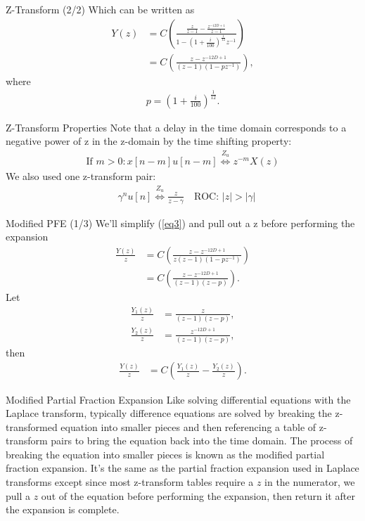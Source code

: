 \documentclass[
    orient=landscape,
    style=sailor
]{powerdot}
\begin{document}
\begin{slide}{Z-Transform (2/2)}	
	Which can be written as
	\begin{align}
	Y(z) &=  C\left(\frac{\frac{z}{z-1} - \frac{z^{-12D+1}}{z-1}}
	{1 - \left(1 + \frac{i}{100} \right)^{\frac{1}{12}}z^{-1}}\right) \\
	&=  C\left(\frac{z - z^{-12D+1}}{(z-1)(1 - p z^{-1})}\right), \label{eq3}
	\end{align}
	where 
	\begin{align}
	p = \left(1 + \frac{i}{100} \right)^{\frac{1}{12}}.
	\end{align}
\end{slide}

\begin{slide}{Z-Transform Properties}
	Note that a delay in the time domain corresponds to a negative power of z in the z-domain by the time shifting property:
	\begin{align}
	\text{If }m>0: x[n-m]u[n-m] \stackrel{Z_u}{\Longleftrightarrow} z^{-m} X(z) \label{prop1}
	\end{align}
	We also used one z-transform pair:
	\begin{align}
	&\gamma^nu[n] \stackrel{Z_u}{\Longleftrightarrow} \frac{z}{z-\gamma} \quad\text{ROC: } |z|>|\gamma| \label{tp1}
	\end{align}
\end{slide}

\begin{slide}{Modified PFE (1/3)}
	We'll simplify (\ref{eq3}) and pull out a z before performing the expansion
	\begin{align}
	\frac{Y(z)}{z} &= C \left( \frac{z - z^{-12D+1}}{z(z-1)(1 - pz^{-1})} \right) \\
	&= C \left( \frac{z - z^{-12D+1}}{(z-1)(z - p)} \right).
	\end{align}
	Let
	\begin{align}
	\frac{Y_1(z)}{z} &= \frac{z}{(z-1)(z - p)}, \\
	\frac{Y_2(z)}{z} &= \frac{z^{-12D+1}}{(z-1)(z - p)},
	\end{align}
	then
	\begin{align}
	\frac{Y(z)}{z} &= C \left( \frac{Y_1(z)}{z} - \frac{Y_2(z)}{z} \right).
	\end{align}
\end{slide}

\begin{note}{Modified Partial Fraction Expansion}
	Like solving differential equations with the Laplace transform, typically difference equations are solved by breaking the z-transformed equation into smaller pieces and then referencing a table of z-transform pairs to bring the equation back into the time domain. The process of breaking the equation into smaller pieces is known as the modified partial fraction expansion. It's the same as the partial fraction expansion used in Laplace transforms except since most z-transform tables require a $z$ in the numerator, we pull a $z$ out of the equation before performing the expansion, then return it after the expansion is complete.
\end{note}
\end{document}
